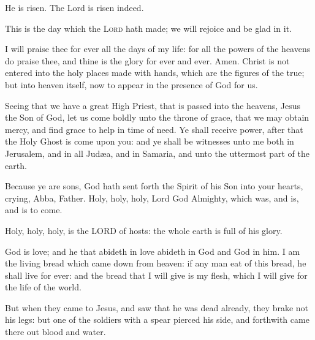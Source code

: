 \begin{multicols}{2}
	He is risen. The Lord is risen indeed.
	\par
    This is the day which the \textsc{Lord} hath made; we will rejoice and be glad in it.
    \par
    I will praise thee for ever all the days of my life: for all the powers of the heavens do praise thee, and thine is the glory for ever and ever. Amen. 
	Christ is not entered into the holy places made with hands, which are the figures of the true; but into heaven itself, now to appear in the presence of God for us.
	\par
	Seeing that we have a great High Priest, that is passed into the heavens, Jesus the Son of God, let us come boldly unto the throne of grace, that we may obtain mercy, and find grace to help in time of need.
	Ye shall receive power, after that the Holy Ghost is come upon you: and ye shall be witnesses unto me both in Jerusalem, and in all Jud{\ae}a, and in Samaria, and unto the uttermost part of the earth.
	\par
    Because ye are sons, God hath sent forth the Spirit of his Son into your hearts, crying, Abba, Father.
	Holy, holy, holy, Lord God Almighty, which was, and is, and is to come.
	\par
	Holy, holy, holy, is the LORD of hosts: the whole earth is full of his glory. 
	\par
	God is love; and he that abideth in love abideth in God and God in him.
	I am the living bread which came down from heaven: if any man eat of this bread, he shall live for ever: and the bread that I will give is my flesh, which I will give for the life of the world. \par
	But when they came to Jesus, and saw that he was dead already, they brake not his legs: but one of the soldiers with a spear pierced his side, and forthwith came there out blood and water.\par

\end{multicols}

